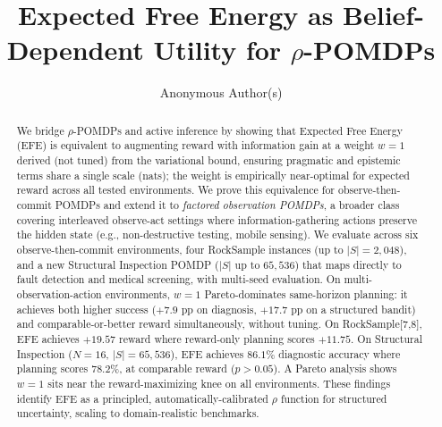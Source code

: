\documentclass[runningheads]{llncs}
\begin{document}
\title{Expected Free Energy as Belief-Dependent Utility for $\rho$-POMDPs}


\author{Anonymous Author(s)}



\maketitle

\begin{abstract}
We bridge $\rho$-POMDPs and active inference by showing that Expected Free Energy (EFE) is equivalent to augmenting reward with information gain at a weight $w{=}1$ derived (not tuned) from the variational bound, ensuring pragmatic and epistemic terms share a single scale (nats); the weight is empirically near-optimal for expected reward across all tested environments. We prove this equivalence for observe-then-commit POMDPs and extend it to \emph{factored observation POMDPs}, a broader class covering interleaved observe-act settings where information-gathering actions preserve the hidden state (e.g., non-destructive testing, mobile sensing). We evaluate across six observe-then-commit environments, four RockSample instances (up to $|S|{=}2{,}048$), and a new Structural Inspection POMDP ($|S|$ up to $65{,}536$) that maps directly to fault detection and medical screening, with multi-seed evaluation. On multi-observation-action environments, $w{=}1$ Pareto-dominates same-horizon planning: it achieves both higher success ($+7.9$ pp on diagnosis, $+17.7$ pp on a structured bandit) and comparable-or-better reward simultaneously, without tuning. On RockSample[7,8], EFE achieves $+19.57$ reward where reward-only planning scores $+11.75$. On Structural Inspection ($N{=}16$, $|S|{=}65{,}536$), EFE achieves $86.1\%$ diagnostic accuracy where planning scores $78.2\%$, at comparable reward ($p > 0.05$). A Pareto analysis shows $w{=}1$ sits near the reward-maximizing knee on all environments. These findings identify EFE as a principled, automatically-calibrated $\rho$ function for structured uncertainty, scaling to domain-realistic benchmarks.
\end{abstract}
\end{document}
